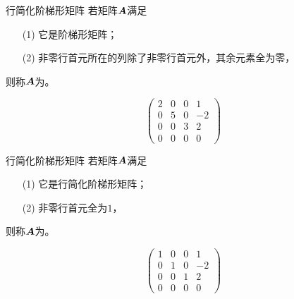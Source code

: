 \begin{frame}
  \begin{dingyi}{行简化阶梯形矩阵}
    若矩阵$\boldsymbol{A}$满足
    \begin{itemize}
    \item[(1)] 它是阶梯形矩阵；
    \item[(2)] 非零行首元所在的列除了非零行首元外，其余元素全为零，
    \end{itemize}
    则称$\boldsymbol{A}$为。
  \end{dingyi}

  \begin{li*}
    $$
    \left(
      \begin{array}{rrrr}
        2&0&0&1\\
        0&5&0&-2\\
        0&0&3&2\\
        0&0&0&0
      \end{array}
    \right)
    $$
  \end{li*}
\end{frame}

\begin{frame}
  \begin{dingyi}{行简化阶梯形矩阵}
    若矩阵$\boldsymbol{A}$满足
    \begin{itemize}
    \item[(1)] 它是行简化阶梯形矩阵；
    \item[(2)] 非零行首元全为$1$，
    \end{itemize}
    则称$\boldsymbol{A}$为。
  \end{dingyi}

  \begin{li*}
    $$
    \left(
      \begin{array}{rrrr}
        1&0&0&1\\
        0&1&0&-2\\
        0&0&1&2\\
        0&0&0&0
      \end{array}
    \right)
    $$
  \end{li*}
\end{frame}



